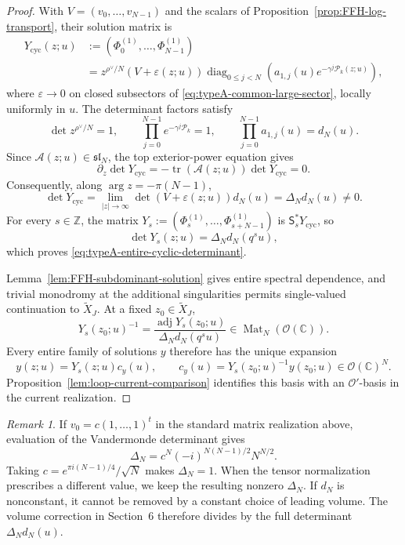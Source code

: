 \documentclass[11pt,leqno]{amsart}
\numberwithin{equation}{section}
\theoremstyle{plain}
\theoremstyle{definition}
\theoremstyle{plain}
\theoremstyle{definition}
\theoremstyle{remark}
\newtheorem{remark}[theorem]{Remark}
\begin{document}
\begin{proof}
With $V=(v_0,\ldots,v_{N-1})$ and the scalars of Proposition~\ref{prop:FFH-log-transport}, their solution matrix is
\begin{equation}\label{eq:typeA-large-sector-factorization}
 \begin{aligned}
 Y_{\mathrm{cyc}}(z;u)
 &:=(\Phi_0^{(1)},\ldots,\Phi_{N-1}^{(1)})\\
 &=z^{\rho^\vee/N}(V+\varepsilon(z;u))
   \operatorname{diag}_{0\le j<N}
   \left(a_{1,j}(u)e^{-\gamma^j\mathcal P_k(z;u)}\right),
 \end{aligned}
\end{equation}
where $\varepsilon\to0$ on closed subsectors of \eqref{eq:typeA-common-large-sector}, locally uniformly in $u$.  The determinant factors satisfy
\[
 \det z^{\rho^\vee/N}=1,\qquad
 \prod_{j=0}^{N-1}e^{-\gamma^j\mathcal P_k}=1,\qquad
 \prod_{j=0}^{N-1}a_{1,j}(u)=d_N(u).
\]
Since $\mathscr A(z;u)\in\mathfrak{sl}_N$, the top exterior-power equation gives
\[
 \partial_z\det Y_{\mathrm{cyc}}
 =-\operatorname{tr}(\mathscr A(z;u))\det Y_{\mathrm{cyc}}=0.
\]
Consequently, along $\arg z=-\pi(N-1)$,
\[
 \det Y_{\mathrm{cyc}}
 =\lim_{|z|\to\infty}\det(V+\varepsilon(z;u))d_N(u)
 =\Delta_Nd_N(u)\ne0.
\]
For every $s\in\mathbb Z$, the matrix $Y_s:=(\Phi_s^{(1)},\ldots,\Phi_{s+N-1}^{(1)})$ is $\mathsf S_s^*Y_{\mathrm{cyc}}$, so
\[
 \det Y_s(z;u)=\Delta_Nd_N(q^su),
\]
which proves \eqref{eq:typeA-entire-cyclic-determinant}.

Lemma~\ref{lem:FFH-subdominant-solution} gives entire spectral dependence, and trivial monodromy at the additional singularities permits single-valued continuation to $\widetilde X_J$.  At a fixed $z_0\in\widetilde X_J$,
\[
 Y_s(z_0;u)^{-1}
 =\frac{\operatorname{adj}Y_s(z_0;u)}
        {\Delta_Nd_N(q^su)}
 \in\operatorname{Mat}_N(\mathcal O(\mathbb C)).
\]
Every entire family of solutions $y$ therefore has the unique expansion
\[
 y(z;u)=Y_s(z;u)c_y(u),\qquad
 c_y(u)=Y_s(z_0;u)^{-1}y(z_0;u)\in\mathcal O(\mathbb C)^N.
\]
Proposition~\ref{lem:loop-current-comparison} identifies this basis with an $\mathcal O'$-basis in the current realization.
\end{proof}

\begin{remark}\label{rem:typeA-volume-constant}
If $v_0=c(1,\ldots,1)^t$ in the standard matrix realization above, evaluation of the Vandermonde determinant gives
\[
 \Delta_N=c^N(-i)^{N(N-1)/2}N^{N/2}.
\]
Taking $c=e^{\pi i(N-1)/4}/\sqrt N$ makes $\Delta_N=1$.  When the tensor normalization prescribes a different value, we keep the resulting nonzero $\Delta_N$.  If $d_N$ is nonconstant, it cannot be removed by a constant choice of leading volume.  The volume correction in Section~6 therefore divides by the full determinant $\Delta_Nd_N(u)$.
\end{remark}
\end{document}
